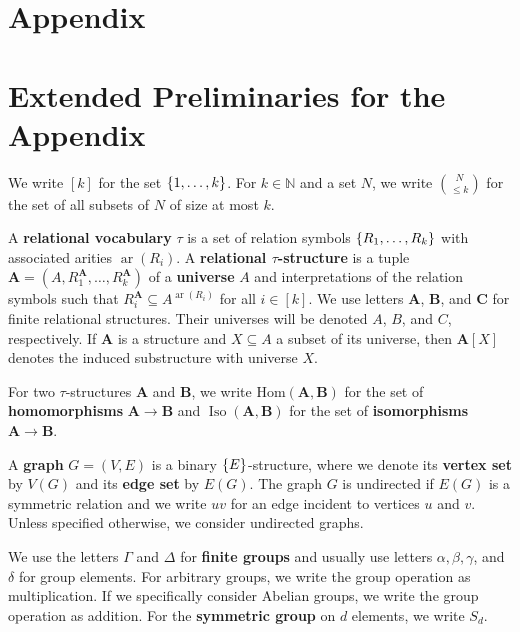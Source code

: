 \documentclass[a4paper,english, thm-restate]{lipics-v2021}
\newcommand{\nat}{\mathbb{N}}
\newcommand{\defining}[1]{\textbf{#1}}
\DeclarePairedDelimiter\set{\lbrace}{\rbrace}
\newcommand{\sig}{\tau}
\newcommand{\arity}[1]{\operatorname*{ar}(#1)}
\newcommand{\StructA}{\mathbf{A}}
\newcommand{\StructB}{\mathbf{B}}
\newcommand{\StructC}{\mathbf{C}}
\newcommand{\Hom}[2]{\mathrm{Hom}(#1,#2)}
\newcommand{\isos}[2]{\operatorname*{Iso}(#1,#2)}
\newcommand{\Sym}[1]{S_{#1}}
\begin{document}
	
	
	
	
	
	
	
	
	\newpage
	\appendix
	
	\section*{Appendix}
	
	
	
	
	\section{Extended Preliminaries for the Appendix}
	We write $[k]$ for the set $\set{1,\dots ,k}$.
	For $k \in \nat$ and a set $N$, we write $\binom{N}{\leq k}$ for
	the set of  all subsets of $N$  of size at most $k$.
	
	A \defining{relational vocabulary} $\sig$ is a set of relation symbols $\set{R_1,\dots,R_k}$
	with associated arities $\arity{R_i}$.
	A \defining{relational $\sig$-structure} is a tuple $\StructA= (A,R_1^\StructA,\dots, R_k^\StructA)$ of a \defining{universe} $A$ and interpretations of the relation symbols
	such that $R_i^\StructA \subseteq A^{\arity{R_i}}$ for all $i \in [k]$.
	We use letters $\StructA$, $\StructB$, and $\StructC$ for finite relational structures.
	Their universes will be denoted $A$, $B$, and $C$, respectively.
	If $\StructA$ is a structure and $X \subseteq A$ a subset of its universe, then $\StructA[X]$ denotes the induced substructure with universe $X$.
	
	
	For two $\sig$-structures $\StructA$ and $\StructB$, we write $\Hom{\StructA}{\StructB}$ for the set of \defining{homomorphisms} ${\StructA \to \StructB}$
	and $\isos{\StructA}{\StructB}$ for the set of \defining{isomorphisms} $\StructA \to \StructB$.
	
	
	
	A \defining{graph} $G=(V,E)$ is a binary $\set{E}$-structure,
	where we denote its \defining{vertex set} by $V(G)$ and its \defining{edge set} by $E(G)$.
	The graph $G$ is undirected if $E(G)$ is a symmetric relation
	and we write $uv$ for an edge incident to vertices $u$ and $v$.
	Unless specified otherwise, we consider undirected graphs.
	
	We use the letters $\Gamma$ and $\Delta$ for \defining{finite groups}
	and usually use letters $\alpha,\beta,\gamma$, and $\delta$ for group elements.
	For arbitrary groups, we write the group operation as multiplication.
	If we specifically consider Abelian groups, we write the group operation as addition. For the \defining{symmetric group} on $d$ elements, we write $\Sym{d}$.
	
\end{document}
